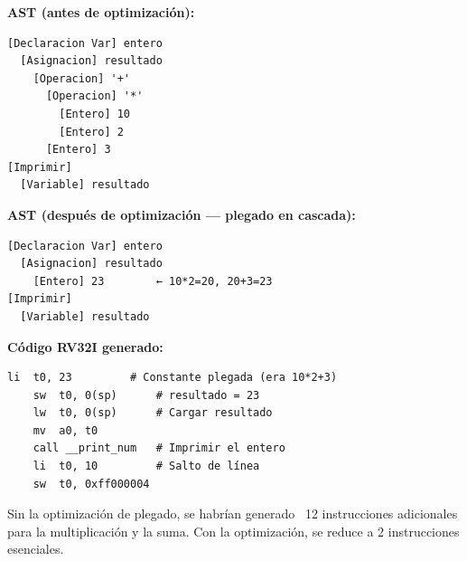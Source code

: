 \textbf{AST (antes de optimización):}
\begin{verbatim}
[Declaracion Var] entero
  [Asignacion] resultado
    [Operacion] '+'
      [Operacion] '*'
        [Entero] 10
        [Entero] 2
      [Entero] 3
[Imprimir]
  [Variable] resultado
\end{verbatim}

\textbf{AST (después de optimización — plegado en cascada):}
\begin{verbatim}
[Declaracion Var] entero
  [Asignacion] resultado
    [Entero] 23        ← 10*2=20, 20+3=23
[Imprimir]
  [Variable] resultado
\end{verbatim}

\textbf{Código RV32I generado:}
\begin{lstlisting}[style=asmstyle, caption={Ensamblador RV32I generado}]
    li  t0, 23         # Constante plegada (era 10*2+3)
    sw  t0, 0(sp)      # resultado = 23
    lw  t0, 0(sp)      # Cargar resultado
    mv  a0, t0
    call __print_num   # Imprimir el entero
    li  t0, 10         # Salto de línea
    sw  t0, 0xff000004
\end{lstlisting}

Sin la optimización de plegado, se habrían generado ~12 instrucciones adicionales para la multiplicación y la suma. Con la optimización, se reduce a 2 instrucciones esenciales.
